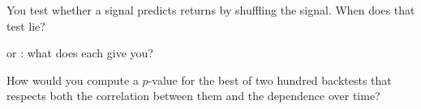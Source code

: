 \begin{interviewq}\label{iq:qm:resampling:4}
You test whether a signal predicts returns by shuffling the signal. When does that test lie?
\end{interviewq}

\begin{interviewq}\label{iq:qm:resampling:5}
 or : what does each give you?
\end{interviewq}

\begin{interviewq}\label{iq:qm:resampling:6}
How would you compute a $p$-value for the best of two hundred backtests that respects both the correlation between them and the
dependence over time?
\end{interviewq}
